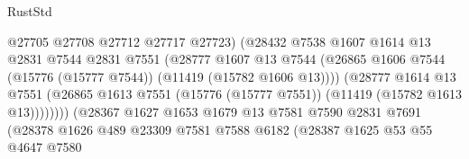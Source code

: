 \begin{lexlean}{RustStd}
\begin{coremodule}
                                          @27705
                                          @27708
                                          @27712
                                          @27717
                                          @27723)
                                        (@28432
                                          @7538
                                          @1607
                                          @1614
                                          @13
                                          @2831
                                          @7544
                                          @2831
                                          @7551
                                          (@28777
                                            @1607
                                            @13
                                            @7544
                                            (@26865
                                              @1606
                                              @7544
                                              (@15776 (@15777 @7544))
                                              (@11419 (@15782 @1606 @13))))
                                          (@28777
                                            @1614
                                            @13
                                            @7551
                                            (@26865
                                              @1613
                                              @7551
                                              (@15776 (@15777 @7551))
                                              (@11419 (@15782 @1613 @13))))))))
                                  (@28367
                                    @1627
                                    @1653
                                    @1679
                                    @13
                                    @7581
                                    @7590
                                    @2831
                                    @7691
                                    (@28378
                                      @1626
                                      @489
                                      @23309
                                      @7581
                                      @7588
                                      @6182
                                      (@28387
                                        @1625
                                        @53
                                        @55
                                        @4647
                                        @7580

\end{coremodule}
\end{lexlean}
